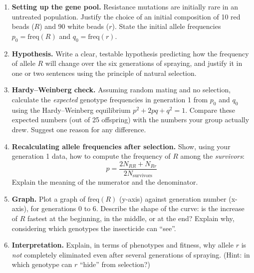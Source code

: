 \documentclass[11pt]{article}
\newcounter{popsec}
\newcounter{popsub}
\newcommand{\courssub}[1]{%
  \stepcounter{popsub}%
  \par\vspace{9pt}\noindent{\popxbold\fontsize{11.5}{13}\selectfont\color{popink}{\color{poporange}\thepopsec.\thepopsub}\hspace{6pt}#1}\par\nopagebreak\vspace{4pt}
}
\begin{document}
\courssub{Tasks}

\begin{enumerate}
\item \textbf{Setting up the gene pool.} Resistance mutations are initially rare in an untreated population. Justify the choice of an initial composition of 10 red beads ($R$) and 90 white beads ($r$). State the initial allele frequencies $p_0 = \mathrm{freq}(R)$ and $q_0 = \mathrm{freq}(r)$.

\item \textbf{Hypothesis.} Write a clear, testable hypothesis predicting how the frequency of allele $R$ will change over the six generations of spraying, and justify it in one or two sentences using the principle of natural selection.

\item \textbf{Hardy--Weinberg check.} Assuming random mating and no selection, calculate the \emph{expected} genotype frequencies in generation 1 from $p_0$ and $q_0$ using the Hardy--Weinberg equilibrium $p^2 + 2pq + q^2 = 1$. Compare these expected numbers (out of 25 offspring) with the numbers your group actually drew. Suggest one reason for any difference.

\item \textbf{Recalculating allele frequencies after selection.} Show, using your generation 1 data, how to compute the frequency of $R$ among the \emph{survivors}:
\[
p = \frac{2N_{RR} + N_{Rr}}{2N_{\text{survivors}}}
\]
Explain the meaning of the numerator and the denominator.

\item \textbf{Graph.} Plot a graph of $\mathrm{freq}(R)$ (y-axis) against generation number (x-axis), for generations 0 to 6. Describe the shape of the curve: is the increase of $R$ fastest at the beginning, in the middle, or at the end? Explain why, considering which genotypes the insecticide can ``see''.

\item \textbf{Interpretation.} Explain, in terms of phenotypes and fitness, why allele $r$ is \emph{not} completely eliminated even after several generations of spraying. (Hint: in which genotype can $r$ ``hide'' from selection?)


\end{enumerate}
\end{document}
